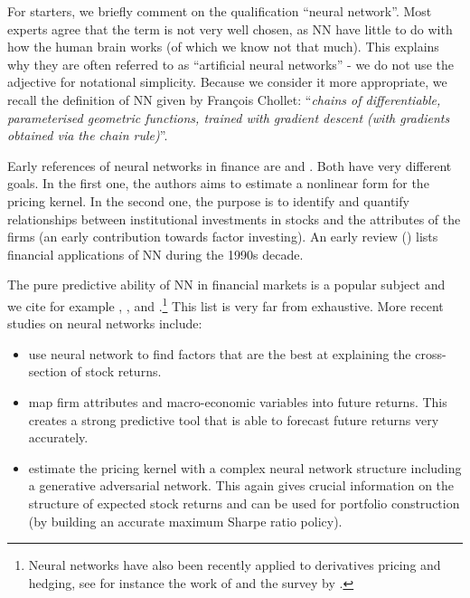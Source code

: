 \documentclass[]{krantz}
\let\rmarkdownfootnote\footnote%
\def\footnote{\protect\rmarkdownfootnote}
\theoremstyle{definition}
\theoremstyle{definition}
\theoremstyle{definition}
\theoremstyle{remark}
\begin{document}
For starters, we briefly comment on the qualification ``neural
network''. Most experts agree that the term is not very well chosen, as
NN have little to do with how the human brain works (of which we know
not that much). This explains why they are often referred to as
``artificial neural networks'' - we do not use the adjective for
notational simplicity. Because we consider it more appropriate, we
recall the definition of NN given by François Chollet: ``\emph{chains of
differentiable, parameterised geometric functions, trained with gradient
descent (with gradients obtained via the chain rule)}''.

Early references of neural networks in finance are \citet{bansal1993no}
and \citet{eakins1998analyzing}. Both have very different goals. In the
first one, the authors aims to estimate a nonlinear form for the pricing
kernel. In the second one, the purpose is to identify and quantify
relationships between institutional investments in stocks and the
attributes of the firms (an early contribution towards factor
investing). An early review (\citet{burrell1997impact}) lists financial
applications of NN during the 1990s decade.

The pure predictive ability of NN in financial markets is a popular
subject and we cite for example \citet{kimoto1990stock},
\citet{enke2005use}, \citet{zhang2009stock} and
\citet{guresen2011using}.\footnote{Neural networks have also been
  recently applied to derivatives pricing and hedging, see for instance
  the work of \citet{buehler2019deep} and the survey by
  \citet{ruf2019neural}.} This list is very far from exhaustive. More
recent studies on neural networks include:

\begin{itemize}
\item
  \citet{feng2019deep} use neural network to find factors that are the
  best at explaining the cross-section of stock returns.\\
\item
  \citet{gu2018empirical} map firm attributes and macro-economic
  variables into future returns. This creates a strong predictive tool
  that is able to forecast future returns very accurately.
\item
  \citet{chen2019deep} estimate the pricing kernel with a complex neural
  network structure including a generative adversarial network. This
  again gives crucial information on the structure of expected stock
  returns and can be used for portfolio construction (by building an
  accurate maximum Sharpe ratio policy).
\end{itemize}
\end{document}

